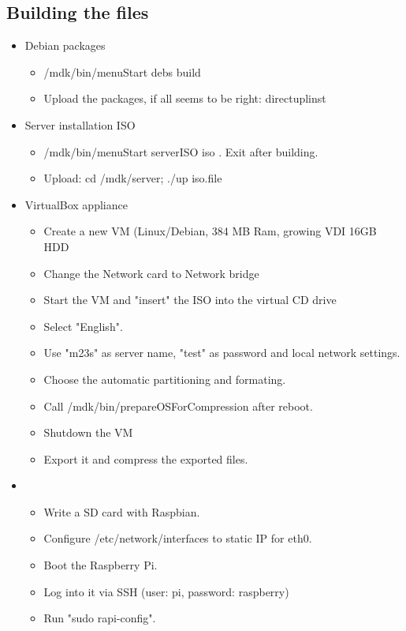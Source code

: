 \subsection{Building the files}
\begin{itemize}
\item Debian packages
	\begin{itemize}
		\item /mdk/bin/menuStart \Rightarrow debs \Rightarrow build
		\item Upload the packages, if all seems to be right: \Rightarrow directuplinst
	\end{itemize}
\item Server installation ISO
	\begin{itemize}
		\item /mdk/bin/menuStart \Rightarrow serverISO \Rightarrow iso . Exit after building.
		\item Upload: cd /mdk/server; ./up iso.file
	\end{itemize}
\item VirtualBox appliance
	\begin{itemize}
		\item Create a new VM (Linux/Debian, 384 MB Ram, growing VDI 16GB HDD
		\item Change the Network card to Network bridge
		\item Start the VM and "insert" the ISO into the virtual CD drive
		\item Select "English".
		\item Use "m23s" as server name, "test" as password and local network settings.
		\item Choose the automatic partitioning and formating.
		\item Call /mdk/bin/prepareOSForCompression after reboot.
		\item Shutdown the VM
		\item Export it and compress the exported files.
	\end{itemize}
\item
	\begin{itemize}
		\item Write a SD card with Raspbian.
		\item Configure /etc/network/interfaces to static IP for eth0.
		\item Boot the Raspberry Pi.
		\item Log into it via SSH (user: pi, password: raspberry)
		\item Run "sudo rapi-config".

\end{itemize}
\end{itemize}
